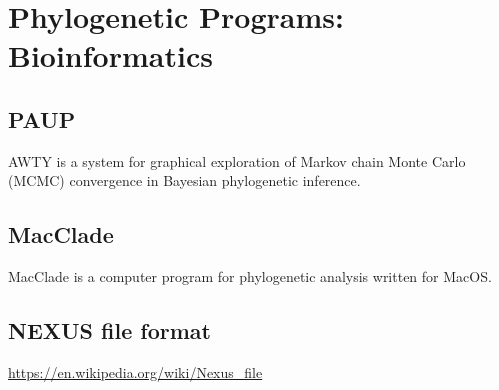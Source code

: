 \chapter{Phylogenetic Programs: Bioinformatics}


\section{PAUP}
\label{sec:PAUP-software-phylogenetic}

AWTY is a system for graphical exploration of Markov chain Monte Carlo (MCMC)
convergence in Bayesian phylogenetic inference.

\section{MacClade}
\label{sec:MacClade}

MacClade is a computer program for phylogenetic analysis written for MacOS.


\section{NEXUS file format}

\url{https://en.wikipedia.org/wiki/Nexus_file}